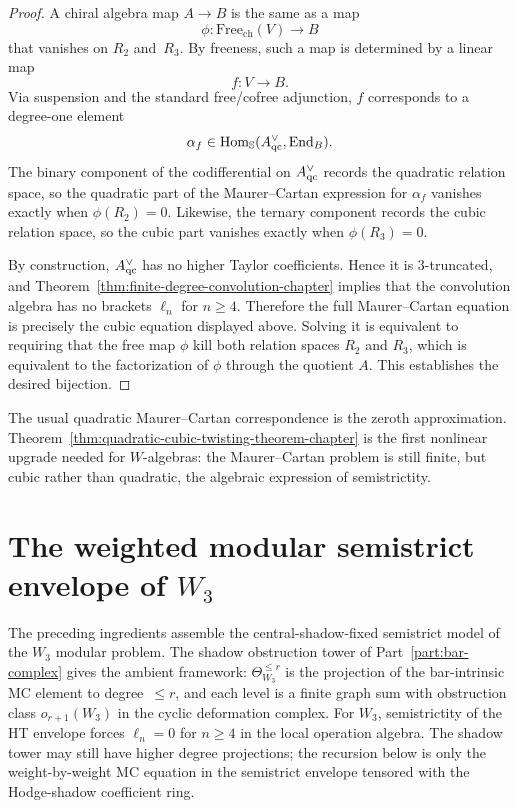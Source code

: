 \begin{proof}
A chiral algebra map $A\to B$ is the same as a map
\[
\phi:\mathrm{Free}_{\mathrm{ch}}(V)\to B
\]
that vanishes on $R_2$ and~$R_3$. By freeness, such a map is determined by a linear map
\[
f:V\to B.
\]
Via suspension and the standard free/cofree adjunction, $f$ corresponds to a degree-one element
\[
\alpha_f\in \operatorname{Hom}_{\mathbb S}(A^{\vee}_{\mathrm{qc}},\operatorname{End}_B).
\]
The binary component of the codifferential on $A^{\vee}_{\mathrm{qc}}$ records the quadratic relation space, so the quadratic part of the Maurer--Cartan expression for $\alpha_f$ vanishes exactly when $\phi(R_2)=0$. Likewise, the ternary component records the cubic relation space, so the cubic part vanishes exactly when $\phi(R_3)=0$.

By construction, $A^{\vee}_{\mathrm{qc}}$ has no higher Taylor coefficients. Hence it is $3$-truncated, and Theorem~\ref{thm:finite-degree-convolution-chapter} implies that the convolution algebra has no brackets $\ell_n$ for $n\ge 4$. Therefore the full Maurer--Cartan equation is precisely the cubic equation displayed above. Solving it is equivalent to requiring that the free map $\phi$ kill both relation spaces $R_2$ and $R_3$, which is equivalent to the factorization of $\phi$ through the quotient $A$. This establishes the desired bijection.\qedhere
\end{proof}

\begin{remark}
\label{rem:first-nonquadratic-step}
The usual quadratic Maurer--Cartan correspondence is the zeroth approximation. Theorem~\ref{thm:quadratic-cubic-twisting-theorem-chapter} is the first nonlinear upgrade needed for $W$-algebras: the Maurer--Cartan problem is still finite, but cubic rather than quadratic, the algebraic expression of semistrictity.
\end{remark}

\section{The weighted modular semistrict envelope of \texorpdfstring{$W_3$}{W3}}
\label{sec:weighted-modular-semistrict-envelope}

The preceding ingredients assemble the central-shadow-fixed semistrict model
of the $W_3$ modular problem. The shadow obstruction
tower of Part~\ref{part:bar-complex} gives the ambient framework:
$\Theta_{W_3}^{\le r}$
is the projection of the bar-intrinsic MC element to degree~$\le r$,
and each level is a finite graph sum with obstruction class
$o_{r+1}(W_3)$ in the cyclic deformation complex. For $W_3$,
semistrictity of the HT envelope forces $\ell_n = 0$ for $n \ge 4$ in
the local operation algebra. The shadow tower may still have higher
degree projections; the recursion below is only the weight-by-weight MC
equation in the semistrict envelope tensored with the Hodge-shadow
coefficient ring.

